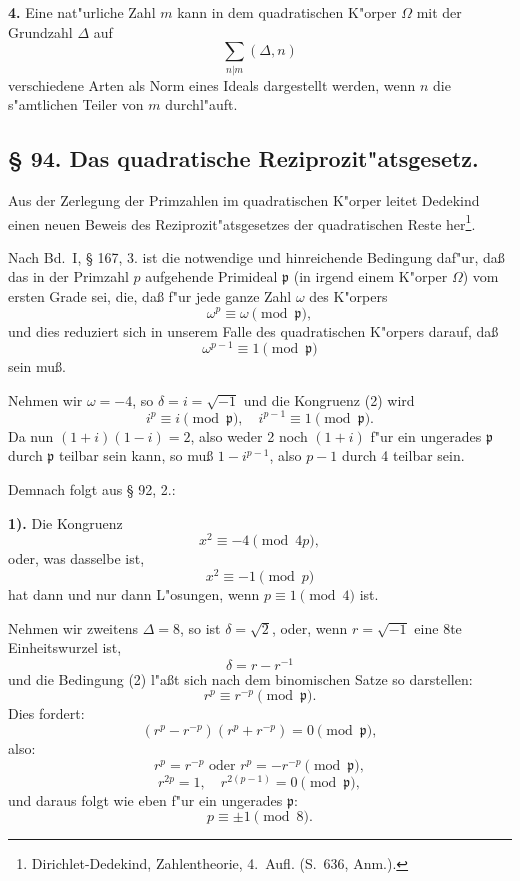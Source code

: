 \documentclass[12pt,a4paper]{article}
\theoremstyle{plain}
\begin{document}
\textbf{4.} Eine nat"urliche Zahl $m$ kann in dem quadratischen K"orper $\Omega$ mit der Grundzahl $\Delta$ auf
\[
\sum_{n|m} (\Delta, n)
\]
verschiedene Arten als Norm eines Ideals dargestellt werden, wenn $n$ die s"amtlichen Teiler von $m$ durchl"auft.

\subsection*{\S{} 94. Das quadratische Reziprozit"atsgesetz.}

Aus der Zerlegung der Primzahlen im quadratischen K"orper leitet Dedekind einen neuen Beweis des Reziprozit"atsgesetzes der quadratischen Reste her\footnote{Dirichlet-Dedekind, Zahlentheorie, 4.~Aufl. (S.~636, Anm.).}.

Nach Bd.~I, \S{} 167, 3. ist die notwendige und hinreichende Bedingung daf"ur, da\ss{} das in der Primzahl $p$ aufgehende Primideal $\mathfrak{p}$ (in irgend einem K"orper $\Omega$) vom ersten Grade sei, die, da\ss{} f"ur jede ganze Zahl $\omega$ des K"orpers
\begin{equation}
\omega^p \equiv \omega \pmod{\mathfrak{p}},
\tag{1}
\end{equation}
und dies reduziert sich in unserem Falle des quadratischen K"orpers darauf, da\ss{}
\begin{equation}
\omega^{p-1} \equiv 1 \pmod{\mathfrak{p}}
\tag{2}
\end{equation}
sein mu\ss.

Nehmen wir $\omega = -4$, so $\delta = i = \sqrt{-1}$ und die Kongruenz (2) wird
\[
i^p \equiv i \pmod{\mathfrak{p}},\quad i^{p-1} \equiv 1 \pmod{\mathfrak{p}}.
\]
Da nun $(1+i)(1-i) = 2$, also weder 2 noch $(1+i)$ f"ur ein ungerades $\mathfrak{p}$ durch $\mathfrak{p}$ teilbar sein kann, so mu\ss{} $1 - i^{p-1}$, also $p - 1$ durch 4 teilbar sein.

Demnach folgt aus \S{} 92, 2.:

\textbf{1).} Die Kongruenz
\[
x^2 \equiv -4 \pmod{4p},
\]
oder, was dasselbe ist,
\[
x^2 \equiv -1 \pmod{p}
\]
hat dann und nur dann L"osungen, wenn $p \equiv 1 \pmod{4}$ ist.

Nehmen wir zweitens $\Delta = 8$, so ist $\delta = \sqrt{2}$, oder, wenn $r = \sqrt{-1}$ eine 8te Einheitswurzel ist,
\[
\delta = r - r^{-1}
\]
und die Bedingung (2) l"a\ss t sich nach dem binomischen Satze so darstellen:
\[
r^p \equiv r^{-p} \pmod{\mathfrak{p}}.
\]
Dies fordert:
\[
(r^p - r^{-p})(r^p + r^{-p}) = 0 \pmod{\mathfrak{p}},
\]
also:
\[
r^p = r^{-p} \text{ oder } r^p = -r^{-p} \pmod{\mathfrak{p}},
\]
\[
r^{2p} = 1,\quad r^{2(p-1)} = 0 \pmod{\mathfrak{p}},
\]
und daraus folgt wie eben f"ur ein ungerades $\mathfrak{p}$:
\[
p \equiv \pm 1 \pmod{8}.
\]
\end{document}
